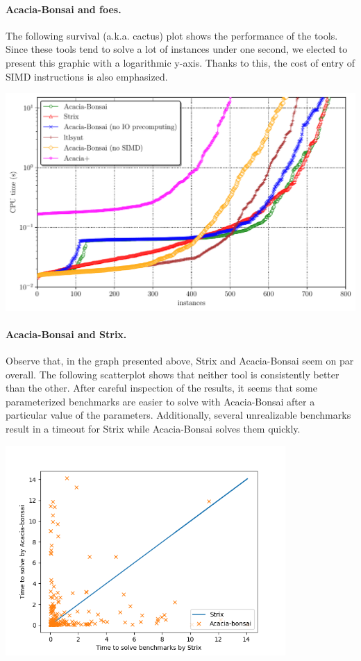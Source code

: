 \documentclass[runningheads,a4paper]{llncs}
\begin{document}
\paragraph{Acacia-Bonsai and foes.}  The following survival (a.k.a. cactus)
plot shows the performance of the tools.  Since these tools tend to solve a
lot of instances under one second, we elected to present this graphic with a
logarithmic y-axis.  Thanks to this, the cost of entry of SIMD instructions is
also emphasized.

\vspace{1em}

\noindent \includegraphics[width=\textwidth]{cactus}

\paragraph{Acacia-Bonsai and Strix.} Observe that, in the graph presented
above, Strix and Acacia-Bonsai seem on par overall. The following scatterplot
shows that neither tool is consistently better than the other. After careful
inspection of the results, it seems that some parameterized benchmarks are
easier to solve with Acacia-Bonsai after a particular value of the parameters.
Additionally, several unrealizable benchmarks result in a timeout for Strix
while Acacia-Bonsai solves them quickly.

\vspace{1em}

\begin{center}
\noindent \includegraphics[width=0.8\textwidth]{scatterplot}
\end{center}
\end{document}

